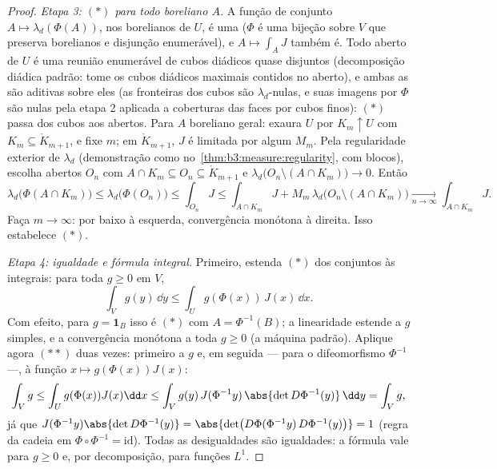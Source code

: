 \begin{proof}
\emph{Etapa 3: $(*)$ para todo boreliano $A$.} A função de
conjunto $A
\mapsto \lambda_d(\Phi(A))$, nos borelianos de $U$, é uma  ($\Phi$ é uma
bijeção sobre $V$ que preserva borelianos e disjunção enumerável), e
$A \mapsto \int_AJ$ também é. Todo aberto de $U$ é uma reunião enumerável de cubos
diádicos  quase disjuntos (decomposição diádica padrão: tome
os cubos diádicos maximais contidos no aberto), e ambas as  são
aditivas sobre eles (as fronteiras dos cubos são $\lambda_d$-nulas, e suas
imagens por $\Phi$ são nulas pela etapa 2 aplicada a coberturas das
faces por cubos finos): $(*)$ passa dos cubos aos abertos. Para
$A$ boreliano geral: exaura $U$ por  $K_m \uparrow U$ com $K_m \subseteq
\mathring K_{m+1}$, e
fixe $m$; em $\mathring K_{m+1}$, $J$ é limitada por algum $M_m$. Pela
regularidade exterior de $\lambda_d$ (demonstração como no~\cref{thm:b3:measure:regularity}, com
blocos), escolha abertos $O_n$ com $A \cap K_m \subseteq O_n
\subseteq \mathring K_{m+1}$ e $\lambda_d\bigl(O_n \setminus
(A\cap K_m)\bigr) \to 0$. Então
\[
\lambda_d\bigl(\Phi(A\cap K_m)\bigr) \leq
\lambda_d\bigl(\Phi(O_n)\bigr) \leq \int_{O_n}J
\leq \int_{A\cap K_m}J + M_m\,\lambda_d\bigl(O_n\setminus(A\cap
K_m)\bigr) \xrightarrow[n\to\infty]{} \int_{A\cap K_m}J .
\]
Faça $m \to \infty$:  por baixo à esquerda, convergência monótona à
direita. Isso estabelece $(*)$.

\emph{Etapa 4: igualdade e fórmula integral.} Primeiro, estenda
$(*)$ dos conjuntos às integrais: para toda $g
\geq 0$  em
$V$,
\[
\int_V g(y)\,\dd y \leq \int_U g(\Phi(x))\,J(x)\,\dd x .
\tag{$**$}
\]
Com efeito, para $g = \mathbf 1_B$ isso é $(*)$ com $A =
\Phi^{-1}(B)$; a linearidade estende
a $g$ simples, e a convergência monótona a toda $g \geq 0$ (a máquina
padrão). Aplique agora $(**)$ duas vezes: primeiro a $g$ e, em
seguida --- para o difeomorfismo $\Phi^{-1}$ ---, à função $x \mapsto g(\Phi(x))J(x)$:
\[
\int_Vg \leq \int_U g(\Phi(x))J(x)\dd x
\leq \int_V g(y)\,J(\Phi^{-1}y)\,\abs{\det
D\Phi^{-1}(y)}\,\dd y = \int_V g ,
\]
já que $J(\Phi^{-1}y)\abs{\det D\Phi^{-1}(y)} = \abs{\det\bigl(
D\Phi(\Phi^{-1}y)\,D\Phi^{-1}(y)\bigr)} = 1$ (regra da cadeia em $\Phi\circ\Phi^{-1} = \mathrm{id}$). Todas as desigualdades são
igualdades: a fórmula vale para $g \geq 0$ e, por decomposição, para funções
$L^1$.
\end{proof}

